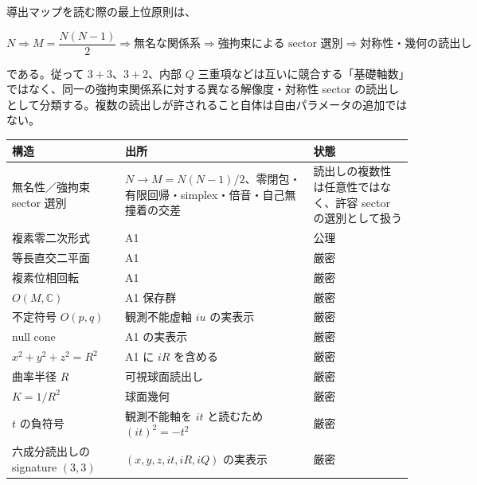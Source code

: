 \documentclass[
  a4paper,
]{ltjsarticle}
\newcounter{none} %
\begin{document}
導出マップを読む際の最上位原則は、

\[
\boxed{
N
\Longrightarrow
M=\frac{N(N-1)}2
\Longrightarrow
\text{無名な関係系}
\Longrightarrow
\text{強拘束による sector 選別}
\Longrightarrow
\text{対称性・幾何の読出し}
}
\]

である。従って \(3+3\)、\(3+2\)、内部 \(Q\)
三重項などは互いに競合する「基礎軸数」ではなく、同一の強拘束関係系に対する異なる解像度・対称性
sector
の読出しとして分類する。複数の読出しが許されること自体は自由パラメータの追加ではない。

{\def\LTcaptype{none} %
\begin{longtable}[]{@{}
  >{\raggedright\arraybackslash}p{}
  >{\raggedright\arraybackslash}p{}
  >{\raggedright\arraybackslash}p{}@{}}
\toprule\noalign{}
\begin{minipage}[b]{\linewidth}\raggedright
構造
\end{minipage} & \begin{minipage}[b]{\linewidth}\raggedright
出所
\end{minipage} & \begin{minipage}[b]{\linewidth}\raggedright
状態
\end{minipage} \\
\midrule\noalign{}
\endhead
\bottomrule\noalign{}
\endlastfoot
無名性／強拘束 sector 選別 &
\(N\to M=N(N-1)/2\)、零閉包・有限回帰・simplex・倍音・自己無撞着の交差 &
読出しの複数性は任意性ではなく、許容 sector の選別として扱う \\
複素零二次形式 & A1 & 公理 \\
等長直交二平面 & A1 & 厳密 \\
複素位相回転 & A1 & 厳密 \\
\(O(M,\mathbb C)\) & A1 保存群 & 厳密 \\
不定符号 \(O(p,q)\) & 観測不能虚軸 \(iu\) の実表示 & 厳密 \\
null cone & A1 の実表示 & 厳密 \\
\(x^2+y^2+z^2=R^2\) & A1 に \(iR\) を含める & 厳密 \\
曲率半径 \(R\) & 可視球面読出し & 厳密 \\
\(K=1/R^2\) & 球面幾何 & 厳密 \\
\(t\) の負符号 & 観測不能軸を \(it\) と読むため \((it)^2=-t^2\) &
厳密 \\
六成分読出しの signature \((3,3)\) & \((x,y,z,it,iR,iQ)\) の実表示 &
厳密 \\

\end{longtable}}
\end{document}
